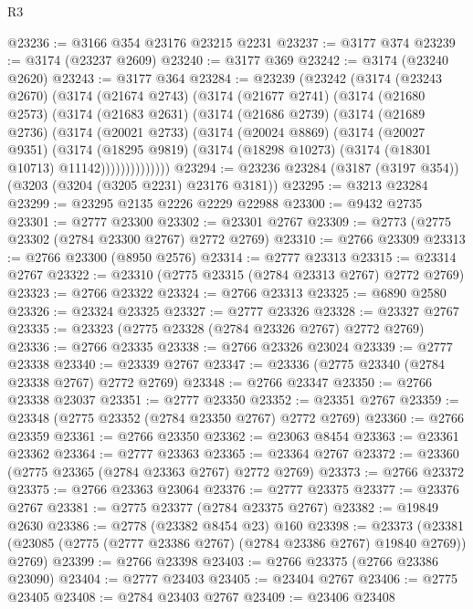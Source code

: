 \begin{lexlean}{R3}
\begin{coremodule}
@23236 := @3166 @354 @23176 @23215 @2231
@23237 := @3177 @374
@23239 := @3174 (@23237 @2609)
@23240 := @3177 @369
@23242 := @3174 (@23240 @2620)
@23243 := @3177 @364
@23284 := @23239
    (@23242
      (@3174
        (@23243 @2670)
        (@3174
          (@21674 @2743)
          (@3174
            (@21677 @2741)
            (@3174
              (@21680 @2573)
              (@3174
                (@21683 @2631)
                (@3174
                  (@21686 @2739)
                  (@3174
                    (@21689 @2736)
                    (@3174
                      (@20021 @2733)
                      (@3174
                        (@20024 @8869)
                        (@3174
                          (@20027 @9351)
                          (@3174
                            (@18295 @9819)
                            (@3174 (@18298 @10273) (@3174 (@18301 @10713) @11142))))))))))))))
@23294 := @23236 @23284 (@3187 (@3197 @354)) (@3203 (@3204 (@3205 @2231) @23176 @3181))
@23295 := @3213 @23284
@23299 := @23295 @2135 @2226 @2229 @22988
@23300 := @9432 @2735
@23301 := @2777 @23300
@23302 := @23301 @2767
@23309 := @2773 (@2775 @23302 (@2784 @23300 @2767) @2772 @2769)
@23310 := @2766 @23309
@23313 := @2766 @23300 (@8950 @2576)
@23314 := @2777 @23313
@23315 := @23314 @2767
@23322 := @23310 (@2775 @23315 (@2784 @23313 @2767) @2772 @2769)
@23323 := @2766 @23322
@23324 := @2766 @23313
@23325 := @6890 @2580
@23326 := @23324 @23325
@23327 := @2777 @23326
@23328 := @23327 @2767
@23335 := @23323 (@2775 @23328 (@2784 @23326 @2767) @2772 @2769)
@23336 := @2766 @23335
@23338 := @2766 @23326 @23024
@23339 := @2777 @23338
@23340 := @23339 @2767
@23347 := @23336 (@2775 @23340 (@2784 @23338 @2767) @2772 @2769)
@23348 := @2766 @23347
@23350 := @2766 @23338 @23037
@23351 := @2777 @23350
@23352 := @23351 @2767
@23359 := @23348 (@2775 @23352 (@2784 @23350 @2767) @2772 @2769)
@23360 := @2766 @23359
@23361 := @2766 @23350
@23362 := @23063 @8454
@23363 := @23361 @23362
@23364 := @2777 @23363
@23365 := @23364 @2767
@23372 := @23360 (@2775 @23365 (@2784 @23363 @2767) @2772 @2769)
@23373 := @2766 @23372
@23375 := @2766 @23363 @23064
@23376 := @2777 @23375
@23377 := @23376 @2767
@23381 := @2775 @23377 (@2784 @23375 @2767)
@23382 := @19849 @2630
@23386 := @2778 (@23382 @8454 @23) @160
@23398 := @23373
    (@23381 (@23085 (@2775 (@2777 @23386 @2767) (@2784 @23386 @2767) @19840 @2769)) @2769)
@23399 := @2766 @23398
@23403 := @2766 @23375 (@2766 @23386 @23090)
@23404 := @2777 @23403
@23405 := @23404 @2767
@23406 := @2775 @23405
@23408 := @2784 @23403 @2767
@23409 := @23406 @23408

\end{coremodule}
\end{lexlean}
